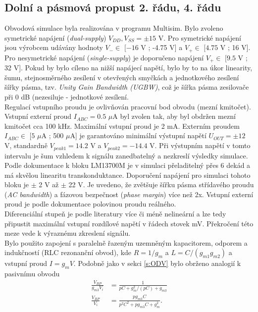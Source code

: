\subsection{Dolní a pásmová propust 2. řádu, 4. řádu}\label{s:DP2}
\noindent Obvodová simulace byla realizována v programu Multisim. Bylo zvoleno symetrické napájení (\textit{dual-supply}) $V_{DD},V_{SS} = \pm 15$ V. Pro symetrické napájení jsou výrobcem udávány hodnoty $V_{-} \in$ $[-16$ V ; -4.75 V] a $V_{+} \in$ $[4.75$ V ; 16 V]. Pro nesymetrické napájení (\textit{single-supply}) je doporučeno napájení $V_{+} \in$ $[9.5$ V ; 32 V]. Pokud by bylo cíleno na nižší napájecí napětí, bylo by to na úkor linearity, šumu, stejnosměrného zesílení v otevřených smyčkách a jednotkového zesílení šířky pásma, tzv. \textit{Unity Gain Bandwidth (UGBW)}, což je šířka pásma zesilovače při 0 dB (nezesiluje - jednotkové zesílení.\\
Regulací vstupního proudu je ovlivňován pracovní bod obvodu (mezní kmitočet). Vstupní externí proud $I_{ABC} = 0.5$ $\mu$A byl zvolen tak, aby byl obdržen mezní kmitočet cca 100 kHz. Maximální vstupní proud je 2 mA. Externím proudem $I_{ABC} \in$ $[5$ $\mu$A ; 500 $\mu$A] je garantováno minimální výstupní napětí $U_{OUT} = \pm 12$ V, standardně $V_{peak 1} = 14.2$ V a $V_{peak 2} = -14.4$ V. Při výstupním napětí v tomto intervalu je šum vzhledem k signálu zanedbatelný a nezkreslí výsledky simulace.\\
\noindent Podle dokumentace k bloku LM13700M je v simulaci přeladitelný přes 6 dekád a má skvělou linearitu transkonduktance. Doporučení napájení pro simulaci tohoto bloku je $\pm$ 2 V až $\pm$ 22 V. Je uvedeno, že zvětšuje šířku pásma střídavého proudu (\textit{AC bandwidth}) a fázovou bezpečnost (\textit{phase margin}) více než 2x. Vstupní externí proud je podle dokumentace polovinou proudu reálného.\\
\noindent Diferenciální stupeň je podle literatury \cite{8} více či méně nelineární a lze tedy připustit maximální vstupní rozdílové napětí v řádech stovek mV. Překročení této meze vede k výraznému zkreslení signálu.\\
\noindent Bylo použito zapojení s paralelně řazeným uzemněným kapacitorem, odporem a indukčností (RLC rezonanční obvod), kde $R = 1/g_m$ a $L = C/(g_{m1}g_{m2})$ a vstupní proud $I = g_mV$. Podobně jako v sekci \ref{s:ODV} bylo obrženo analogií k pasivnímu obvodu
\begin{align}
\frac{V_{BP}}{g_{m3}V_i} &= \frac{1}{pC + g_m^2/(pC) + g_{m3}}\\
\frac{V_{BP}}{V_i} &= \frac{pg_{m3}C}{p^2C^2 + pg_{m3}C + g_m^2}.
\end{align}
